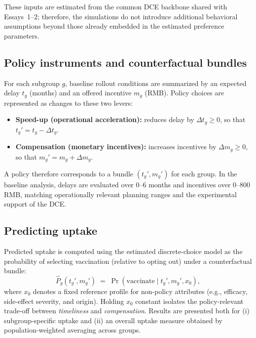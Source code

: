 \documentclass[doublespacing]{utdthesis}
\begin{document}
These inputs are estimated from the common DCE backbone shared with Essays~1--2; therefore, the simulations do not introduce additional behavioral assumptions beyond those already embedded in the estimated preference parameters.

\subsection{Policy instruments and counterfactual bundles}
\label{subsec:essay3_instruments}

For each subgroup $g$, baseline rollout conditions are summarized by an expected delay $t_g$ (months) and an offered incentive $m_g$ (RMB). Policy choices are represented as changes to these two levers:

\begin{itemize}[leftmargin=*]
\item \textbf{Speed-up (operational acceleration):} reduces delay by $\Delta t_g \ge 0$, so that $t_g' = t_g - \Delta t_g$.
\item \textbf{Compensation (monetary incentives):} increases incentives by $\Delta m_g \ge 0$, so that $m_g' = m_g + \Delta m_g$.
\end{itemize}

A policy therefore corresponds to a bundle $(t_g',m_g')$ for each group. In the baseline analysis, delays are evaluated over 0--6 months and incentives over 0--800 RMB, matching operationally relevant planning ranges and the experimental support of the DCE.

\subsection{Predicting uptake}
\label{subsec:essay3_predict_uptake}

Predicted uptake is computed using the estimated discrete-choice model as the probability of selecting vaccination (relative to opting out) under a counterfactual bundle:
\begin{equation}
\widehat{P}_g(t_g',m_g') \;=\; \Pr(\text{vaccinate}\mid t_g',m_g',x_0),
\end{equation}
where $x_0$ denotes a fixed reference profile for non-policy attributes (e.g., efficacy, side-effect severity, and origin). Holding $x_0$ constant isolates the policy-relevant trade-off between \emph{timeliness} and \emph{compensation}. Results are presented both for (i) subgroup-specific uptake and (ii) an overall uptake measure obtained by population-weighted averaging across groups.
\end{document}

